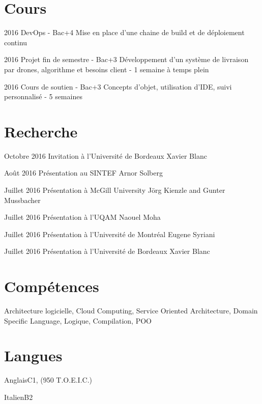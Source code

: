 \documentclass{tccv}
\begin{document}
\section{Cours}

\begin{yearlist}

\item{2016}
     {DevOps - Bac+4}
     {Mise en place d'une chaine de build et de d\'eploiement continu}

\item{2016}
     {Projet fin de semestre - Bac+3}
     {D\'eveloppement d'un syst\`eme de livraison par drones, algorithme et besoins client - 1 semaine \`a temps plein}

\item{2016}
     {Cours de soutien  - Bac+3}
     {Concepts d'objet, utilisation d'IDE, suivi personnalis\'e - 5 semaines}

\end{yearlist}


\section{Recherche}

\begin{yearlist}
      
\item{Octobre 2016}
     {Invitation \`a l'Universit\'e de Bordeaux}
     {Xavier Blanc}
      
\item{Ao\^ut 2016}
     {Pr\'esentation au SINTEF}
     {Arnor Solberg}

\item{Juillet 2016}
     {Pr\'esentation \`a McGill University}
     {J\"org Kienzle and Gunter Mussbacher}

\item{Juillet 2016}
     {Pr\'esentation \`a l'UQAM}
     {Naouel Moha}

\item{Juillet 2016}
     {Pr\'esentation \`a l'Universit\'e de Montr\'eal}
     {Eugene Syriani}
     
\item{Juillet 2016}
     {Pr\'esentation \`a l'Universit\'e de Bordeaux}
     {Xavier Blanc}     

\end{yearlist}

\vspace{-6pt} %
\section{Comp\'etences}
Architecture logicielle, Cloud Computing, Service Oriented Architecture, Domain Specific Language, Logique, Compilation, POO


\section{Langues}

\begin{factlist}
\item{Anglais}{C1, (950 T.O.E.I.C.)}
\item{Italien}{B2}
\end{factlist}
\end{document}
